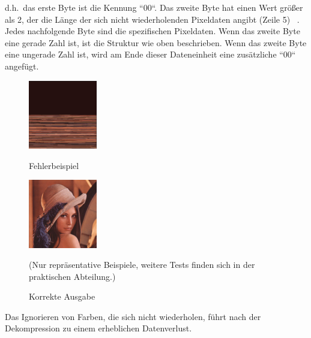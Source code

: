 \documentclass[course=erap]{aspdoc}
\begin{document}
    \noindent d.h.\ das erste Byte ist die Kennung ``00``.
    Das zweite Byte hat einen Wert größer als 2, der die Länge der sich nicht wiederholenden Pixeldaten
    angibt (Zeile 5) \ \cite{bitmapCompression}.
    Jedes nachfolgende Byte sind die spezifischen Pixeldaten.
    \newline
    \newline
    Wenn das zweite Byte eine gerade Zahl ist, ist die Struktur wie oben beschrieben.
    \newline
    Wenn das zweite Byte eine ungerade Zahl ist, wird am Ende dieser Dateneinheit eine zusätzliche ``00`` angefügt.

    \begin{figure}[htbp]
        \begin{minipage}[t]{0.48\textwidth}
            \centering
            \includegraphics[height=3cm, width=3cm]{diagram/Lenna_mistake0}
            \caption{Fehlerbeispiel}
        \end{minipage}
        \begin{minipage}[t]{0.48\textwidth}
            \centering
            \includegraphics[height=3cm, width=3cm]{diagram/Lenna_original}
            \caption{Korrekte Ausgabe}
        \end{minipage}\label{fig:figure2}
        \newline
        (Nur repräsentative Beispiele, weitere Tests finden sich in der praktischen Abteilung.)
    \end{figure}
    \noindent Das Ignorieren von Farben, die sich nicht wiederholen, führt nach der Dekompression zu einem erheblichen
    Datenverlust.
\end{document}

